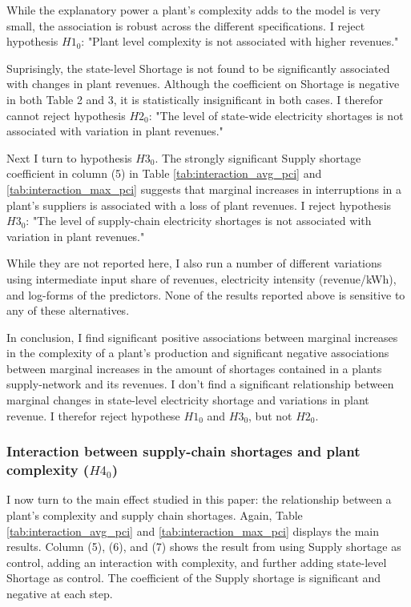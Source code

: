 \documentclass[11pt]{article}
\begin{document}
While the explanatory power a plant's complexity adds to the model is very small, the association is robust across the different specifications. I reject hypothesis $H1_0$: "Plant level complexity is not associated with higher revenues."

Suprisingly, the state-level Shortage is not found to be significantly associated with changes in plant revenues. Although the coefficient on Shortage is negative in both Table 2 and 3, it is statistically insignificant in both cases. I therefor cannot reject hypothesis $H2_0$: "The level of state-wide electricity shortages is not associated with variation in plant revenues." 

Next I turn to hypothesis $H3_0$. The strongly significant Supply shortage coefficient in column (5) in Table \ref{tab:interaction_avg_pci} and \ref{tab:interaction_max_pci} suggests that marginal increases in interruptions in a plant's suppliers is associated with a loss of plant revenues. I reject hypothesis $H3_0$: "The level of supply-chain electricity shortages is not associated with variation in plant revenues." 

While they are not reported here, I also run a number of different variations using intermediate input share of revenues, electricity intensity (revenue/kWh), and log-forms of the predictors. None of the results reported above is sensitive to any of these alternatives.

In conclusion, I find significant positive associations between marginal increases in the complexity of a plant's production and significant negative associations between marginal increases in the amount of shortages contained in a plants supply-network and its revenues. I don't find a significant relationship between marginal changes in state-level electricity shortage and variations in plant revenue. I therefor reject hypothese $H1_0$ and $H3_0$, but not $H2_0$.

\subsubsection{Interaction between supply-chain shortages and plant complexity ($H4_0$)}
\label{sub:h4}
I now turn to the main effect studied in this paper: the relationship between a plant's complexity and supply chain shortages. Again, Table \ref{tab:interaction_avg_pci} and \ref{tab:interaction_max_pci} displays the main results. Column (5), (6), and (7) shows the result from using Supply shortage as control, adding an interaction with complexity, and further adding state-level Shortage as control. The coefficient of the Supply shortage is significant and negative at each step. 
\end{document}
